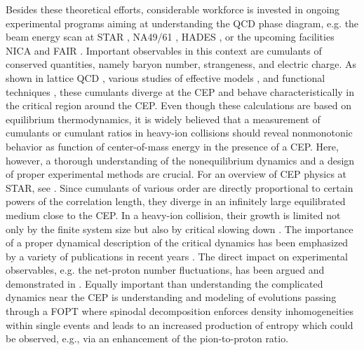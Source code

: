 \documentclass[%
 reprint,
 amsmath,amssymb,
 aps,
]{revtex4-2}
\begin{document}
Besides these theoretical efforts, considerable workforce is invested in ongoing experimental programs aiming at understanding the QCD phase diagram, e.g. the beam energy scan at STAR \cite{STAR:2021iop}, NA49/61 \cite{Grebieszkow:2009jr,Andronov:2018ccl}, HADES \cite{HADES:2020wpc}, or the upcoming facilities NICA \cite{nica:whitepaper} and FAIR \cite{Friman:2011zz}. Important observables in this context are cumulants of conserved quantities, namely baryon number, strangeness, and electric charge. As shown in lattice QCD \cite{Karsch:2016yzt,Bazavov:2020bjn}, various studies of effective models \cite{Skokov:2010uh,Almasi:2017bhq,Wen:2018nkn}, and functional techniques \cite{Isserstedt:2019pgx}, these cumulants diverge at the CEP and behave characteristically in the critical region around the CEP. Even though these calculations are based on equilibrium thermodynamics, it is widely believed that a measurement of cumulants or cumulant ratios in heavy-ion collisions should reveal nonmonotonic behavior as function of center-of-mass energy in the presence of a CEP. Here, however, a thorough understanding of the nonequilibrium dynamics and a design of proper experimental methods are crucial. For an overview of CEP physics at STAR, see \cite{Luo:2017faz}. 
Since cumulants of various order are directly proportional to certain powers of the correlation length, they diverge in an infinitely large equilibrated medium close to the CEP. In a heavy-ion collision, their growth is limited not only by the finite system size but also by critical slowing down \cite{Berdnikov:1999ph}. The importance of a proper dynamical description of the critical dynamics has been emphasized by a variety of publications in recent years \cite{Nahrgang:2011mv,Herold:2013bi,Mukherjee:2015swa,Jiang:2015hri,Herold:2017day,Stephanov:2017ghc,Stephanov:2017wlw,Nahrgang:2018afz,Nahrgang:2020yxm,Du:2020bxp}. The direct impact on experimental observables, e.g. the net-proton number fluctuations, has been argued and demonstrated in \cite{Athanasiou:2010kw,Stephanov:2011pb,Jiang:2015cnt,Herold:2016uvv}. Equally important than understanding the complicated dynamics near the CEP is understanding and modeling of evolutions passing through a FOPT where spinodal decomposition enforces density inhomogeneities within single events \cite{Randrup:2009gp,Randrup:2010ax,Steinheimer:2012gc,Herold:2013qda,Herold:2014zoa,Jiang:2017fas,Poberezhnyuk:2020cen} and leads to an increased production of entropy \cite{Csernai:1992as,Herold:2018ptm} which could be observed, e.g., via an enhancement of the pion-to-proton ratio.
\end{document}
